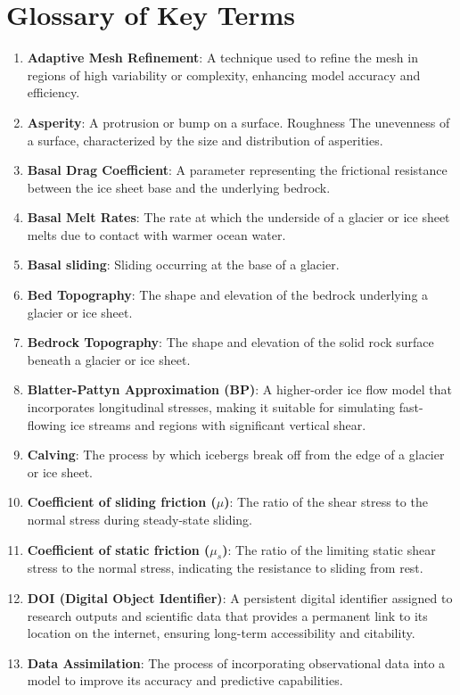 \chapter{Glossary of Key Terms}\label{glossary}
\begin{enumerate}
\item \textbf{Adaptive Mesh Refinement}: A technique used to refine the mesh in regions of high variability or complexity, enhancing model accuracy and efficiency.
\item \textbf{Asperity}: A protrusion or bump on a surface. Roughness The unevenness of a surface, characterized by the size and distribution of asperities.
\item \textbf{Basal Drag Coefficient}: A parameter representing the frictional resistance between the ice sheet base and the underlying bedrock.
\item \textbf{Basal Melt Rates}: The rate at which the underside of a glacier or ice sheet melts due to contact with warmer ocean water.
\item \textbf{Basal sliding}: Sliding occurring at the base of a glacier.
\item \textbf{Bed Topography}: The shape and elevation of the bedrock underlying a glacier or ice sheet.
\item \textbf{Bedrock Topography}: The shape and elevation of the solid rock surface beneath a glacier or ice sheet.
\item \textbf{Blatter-Pattyn Approximation (BP)}: A higher-order ice flow model that incorporates longitudinal stresses, making it suitable for simulating fast-flowing ice streams and regions with significant vertical shear.
\item \textbf{Calving}: The process by which icebergs break off from the edge of a glacier or ice sheet.
\item \textbf{Coefficient of sliding friction ($\mu$)}: The ratio of the shear stress to the normal stress during steady-state sliding.
\item \textbf{Coefficient of static friction ($\mu_s$)}: The ratio of the limiting static shear stress to the normal stress, indicating the resistance to sliding from rest.
\item \textbf{DOI (Digital Object Identifier)}: A persistent digital identifier assigned to research outputs and scientific data that provides a permanent link to its location on the internet, ensuring long-term accessibility and citability.
\item \textbf{Data Assimilation}: The process of incorporating observational data into a model to improve its accuracy and predictive capabilities.

\end{enumerate}
